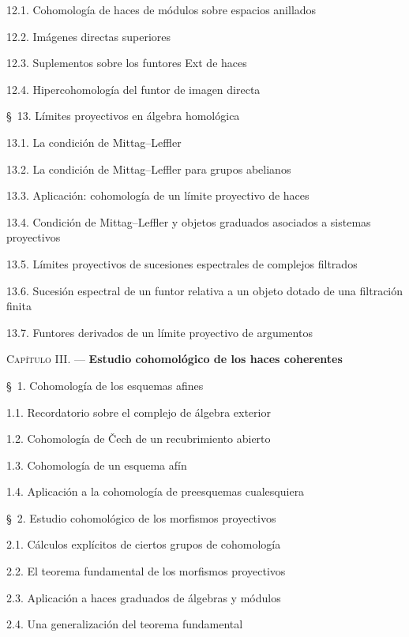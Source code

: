 \documentclass[oneside]{amsart}
\newcommand{\oldpage}[2][]{{\marginnote{\normalfont\textbf{#1}~|~#2}}\ignorespaces}
\begin{document}
\begin{flushleft}
12.1. Cohomología de haces de módulos sobre espacios anillados 

12.2. Imágenes directas superiores 

12.3. Suplementos sobre los funtores Ext de haces 

12.4. Hipercohomología del funtor de imagen directa 

\oldpage[III]{166}

\S~13. Límites proyectivos en álgebra homológica 

13.1. La condición de Mittag--Leffler 

13.2. La condición de Mittag--Leffler para grupos abelianos 

13.3. Aplicación: cohomología de un límite proyectivo de haces 

13.4. Condición de Mittag--Leffler y objetos graduados asociados a sistemas
proyectivos 

13.5. Límites proyectivos de sucesiones espectrales de complejos filtrados

13.6. Sucesión espectral de un funtor relativa a un objeto dotado de una
filtración finita 

13.7. Funtores derivados de un límite proyectivo de argumentos 

\medskip
\textsc{Capítulo III.} --- \textbf{Estudio cohomológico de los haces coherentes}

\medskip
\S~1. Cohomología de los esquemas afines 

1.1. Recordatorio sobre el complejo de álgebra exterior 

1.2. Cohomología de \v Cech de un recubrimiento abierto 

1.3. Cohomología de un esquema afín 

1.4. Aplicación a la cohomología de preesquemas cualesquiera 

\medskip
\S~2. Estudio cohomológico de los morfismos proyectivos 

2.1. Cálculos explícitos de ciertos grupos de cohomología 

2.2. El teorema fundamental de los morfismos proyectivos 

2.3. Aplicación a haces graduados de álgebras y módulos 

2.4. Una generalización del teorema fundamental 


\end{flushleft}
\end{document}
